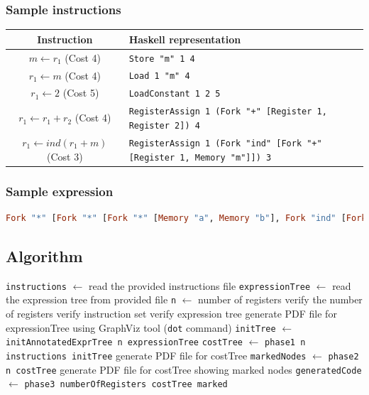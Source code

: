 \documentclass{article}
\begin{document}
\subsubsection{Sample instructions}

\setlength{\tabcolsep}{0.3cm}
\hspace*{-1.8cm}
\begin{tabular}{c|l}
 \textbf{Instruction} & \textbf{Haskell representation} \\ \hline
 $m \leftarrow r_1$ (Cost 4) & \texttt{Store "m" 1 4} \\
 $r_1 \leftarrow m$ (Cost 4) & \texttt{Load 1 "m" 4} \\
 $r_1 \leftarrow 2$ (Cost 5)& \texttt{LoadConstant 1 2 5} \\
 $r_1 \leftarrow r_1 + r_2$ (Cost 4) & \texttt{RegisterAssign 1 (Fork "+" [Register 1, Register 2]) 4} \\
 $r_1 \leftarrow ind (r_1 + m)$ (Cost 3)& \texttt{RegisterAssign 1 (Fork "ind" [Fork "+" [Register 1, Memory "m"]]) 3} 
\end{tabular}

\subsubsection{Sample expression}

\begin{lstlisting}[language=Haskell]
Fork "*" [Fork "*" [Fork "*" [Memory "a", Memory "b"], Fork "ind" [Fork "+" [Constant 1, Constant 2]]], Fork "ind" [Fork "+" [Memory "c", Memory "d"]]]
\end{lstlisting}

\subsection{Algorithm}

\begin{algorithm}[H]
 \texttt{instructions} $\leftarrow$ read the provided instructions file\;
 \texttt{expressionTree} $\leftarrow$ read the expression tree from provided file\;
 \texttt{n} $\leftarrow$ number of registers\;
 verify the number of registers\;
 verify instruction set\;
 verify expression tree\;
 generate PDF file for expressionTree using GraphViz\citep{GraphViz} tool (\texttt{dot} command)\;
 \texttt{initTree} $\leftarrow$ \texttt{initAnnotatedExprTree n expressionTree}\;
 \texttt{costTree} $\leftarrow$ \texttt{phase1 n instructions initTree}\;
 generate PDF file for costTree\;
 \texttt{markedNodes} $\leftarrow$ \texttt{phase2 n costTree}\;
 generate PDF file for costTree showing marked nodes\;
 \texttt{generatedCode} $\leftarrow$ \texttt{phase3 numberOfRegisters costTree marked}\;
 \caption{Main flow of the implementation}
\end{algorithm}
\end{document}
